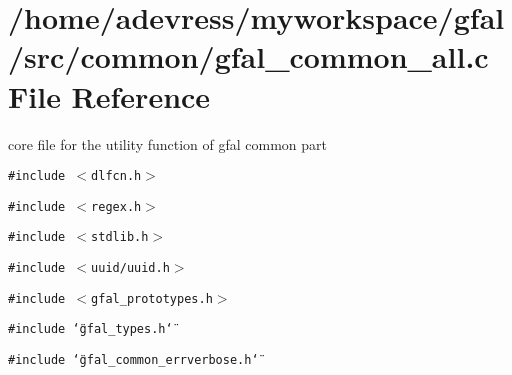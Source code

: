 \section{/home/adevress/myworkspace/gfal/src/common/gfal\_\-common\_\-all.c File Reference}
\label{gfal__common__all_8c}
core file for the utility function of gfal common part 

{\tt \#include $<$dlfcn.h$>$}\par
{\tt \#include $<$regex.h$>$}\par
{\tt \#include $<$stdlib.h$>$}\par
{\tt \#include $<$uuid/uuid.h$>$}\par
{\tt \#include $<$gfal\_\-prototypes.h$>$}\par
{\tt \#include \char`\"{}gfal\_\-types.h\char`\"{}}\par
{\tt \#include \char`\"{}gfal\_\-common\_\-errverbose.h\char`\"{}}\par
